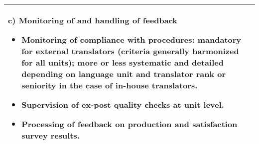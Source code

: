 \documentclass[output=paper]{langsci/langscibook}
\begin{document}
\begin{table}[p]
\begin{tabularx}{\textwidth}{Q}
{\textbf{c) Monitoring of  and handling of feedback}


\begin{itemize}
\item 
Monitoring of compliance with  procedures: mandatory for external translators (criteria generally harmonized for all units); more or less systematic and detailed depending on language unit and translator rank or seniority in the case of in-house translators.
\item 
Supervision of ex-post quality checks at unit level.
\item 
Processing of feedback on production and satisfaction survey results.
\end{itemize}
}\\
\midrule
\end{tabularx}
\end{table}
\end{document}
